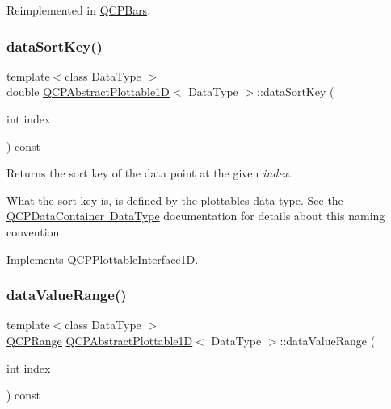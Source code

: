 Reimplemented in \mbox{\hyperlink{class_q_c_p_bars_a55cdaf565cd3384158d1f7f89533bc2d}{Q\+C\+P\+Bars}}.

\mbox{\label{class_q_c_p_abstract_plottable1_d_aa8277da921b009bce474437d50b4a2d8}} 
\subsubsection{\texorpdfstring{dataSortKey()}{dataSortKey()}}
{\footnotesize\ttfamily template$<$class Data\+Type $>$ \\
double \mbox{\hyperlink{class_q_c_p_abstract_plottable1_d}{Q\+C\+P\+Abstract\+Plottable1D}}$<$ Data\+Type $>$\+::data\+Sort\+Key (\begin{DoxyParamCaption}\item[{int}]{index }\end{DoxyParamCaption}) const\hspace{0.3cm}{\ttfamily [virtual]}}





Returns the sort key of the data point at the given {\itshape index}.

What the sort key is, is defined by the plottable\textquotesingle{}s data type. See the \mbox{\hyperlink{class_q_c_p_data_container_qcpdatacontainer-datatype}{Q\+C\+P\+Data\+Container Data\+Type}} documentation for details about this naming convention. 

Implements \mbox{\hyperlink{class_q_c_p_plottable_interface1_d_afdc92f9f01e7e35f2e96b2ea9dc14ae7}{Q\+C\+P\+Plottable\+Interface1D}}.

\mbox{\label{class_q_c_p_abstract_plottable1_d_a55f937ba6a63e56e57f0b1a6e85a333a}} 
\subsubsection{\texorpdfstring{dataValueRange()}{dataValueRange()}}
{\footnotesize\ttfamily template$<$class Data\+Type $>$ \\
\mbox{\hyperlink{class_q_c_p_range}{Q\+C\+P\+Range}} \mbox{\hyperlink{class_q_c_p_abstract_plottable1_d}{Q\+C\+P\+Abstract\+Plottable1D}}$<$ Data\+Type $>$\+::data\+Value\+Range (\begin{DoxyParamCaption}\item[{int}]{index }\end{DoxyParamCaption}) const\hspace{0.3cm}{\ttfamily [virtual]}}





